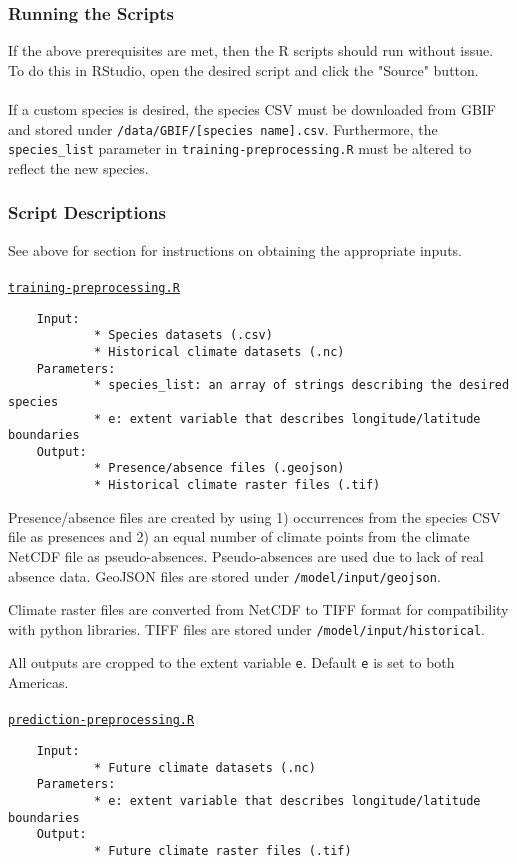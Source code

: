 \documentclass{article}
\begin{document}
\subsubsection*{Running the Scripts}

If the above prerequisites are met, then the R scripts should run without issue. To do this in RStudio, open the desired script and click the "Source" button.
\\\\
If a custom species is desired, the species CSV must be downloaded from GBIF and stored under \texttt{/data/GBIF/[species name].csv}. Furthermore, the \texttt{species\_list} parameter in \texttt{training-preprocessing.R} must be altered to reflect the new species. 

\subsubsection*{Script Descriptions}
See above for section for instructions on obtaining the appropriate inputs.
\\\\
\texttt{\underline{{training-preprocessing.R}}}
\begin{verbatim}
	Input:	
			* Species datasets (.csv)
			* Historical climate datasets (.nc)
	Parameters:
			* species_list: an array of strings describing the desired species 
			* e: extent variable that describes longitude/latitude boundaries 
	Output:
			* Presence/absence files (.geojson)
			* Historical climate raster files (.tif)
\end{verbatim}

Presence/absence files are created by using 1) occurrences from the species CSV file as presences and 2) an equal number of climate points from the climate NetCDF file as pseudo-absences. Pseudo-absences are used due to lack of real absence data. GeoJSON files are stored under \texttt{/model/input/geojson}.

Climate raster files are converted from NetCDF to TIFF format for compatibility with python libraries. TIFF files are stored under \texttt{/model/input/historical}.

All outputs are cropped to the extent variable \texttt{e}. Default \texttt{e} is set to both Americas.
\\\\
\texttt{\underline{prediction-preprocessing.R}}
\begin{verbatim}
	Input:	
			* Future climate datasets (.nc)
	Parameters:
			* e: extent variable that describes longitude/latitude boundaries 
	Output:
			* Future climate raster files (.tif)
\end{verbatim}
\end{document}
